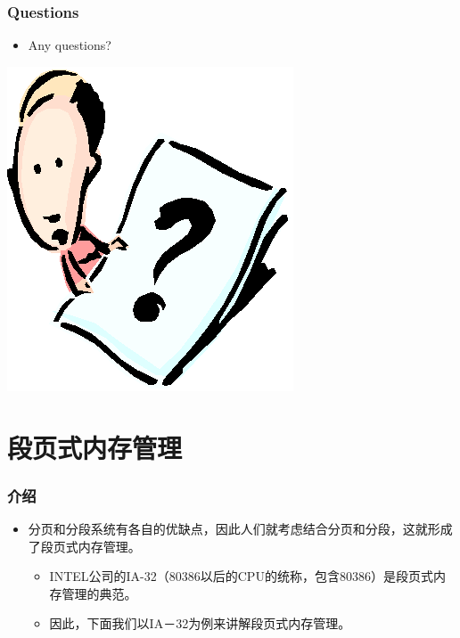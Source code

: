 \documentclass[CJKutf8,xcolor=pdftex,dvipsnames,table]{beamer}
\begin{document}
\begin{CJK*}{UTF8}{song}
  \begin{frame}
  \frametitle{Questions}
  \begin{itemize}
  \item{Any questions?}
  \end{itemize}
  \begin{center}
    \includegraphics[scale=.5]{question}
  \end{center}
  \end{frame}

\section{段页式内存管理}  
  
  \begin{frame}
  \frametitle{介绍} \pause
  \begin{itemize}
  \item{分页和分段系统有各自的优缺点，因此人们就考虑结合分页和分段，这就形成了段页式内存管理。} \pause
    \begin{itemize}
    \item{INTEL公司的IA-32（80386以后的CPU的统称，包含80386）是段页式内存管理的典范。} \pause
    \item{因此，下面我们以IA－32为例来讲解段页式内存管理。}
    \end{itemize}
  \end{itemize}
  \end{frame}
  

\end{CJK*}
\end{document}
